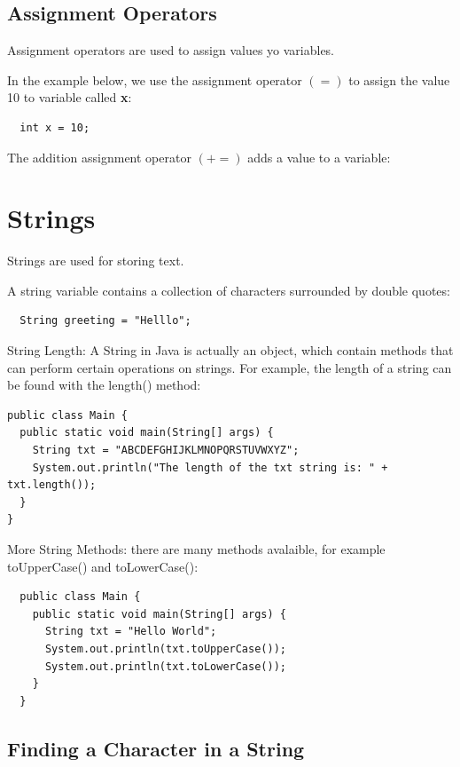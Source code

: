 \subsection{Assignment Operators}

Assignment operators are used to assign values yo variables.

In the example below, we use the assignment operator $(=)$ to assign the value 10 to variable called {\bf x}: 

\begin{verbatim}
  int x = 10;
\end{verbatim}

The addition assignment operator $(+=)$ adds a value to a variable: 


\section{Strings}

Strings are used for storing text. 

A string variable contains a collection of characters surrounded by double quotes: 

\begin{verbatim}
  String greeting = "Helllo";
\end{verbatim}

String Length: A String in Java is actually an object, which contain methods that can perform certain operations on strings. 
For example, the length of a string can be found with the length() method: 

\begin{verbatim}
public class Main {
  public static void main(String[] args) {
    String txt = "ABCDEFGHIJKLMNOPQRSTUVWXYZ";
    System.out.println("The length of the txt string is: " + txt.length());
  }
}
\end{verbatim}

More String Methods: there are many methods avalaible, for example toUpperCase() and toLowerCase(): 

\begin{verbatim}
  public class Main {
    public static void main(String[] args) {
      String txt = "Hello World";
      System.out.println(txt.toUpperCase());
      System.out.println(txt.toLowerCase());
    }
  }  
\end{verbatim}

\subsection{Finding a Character in a String}


